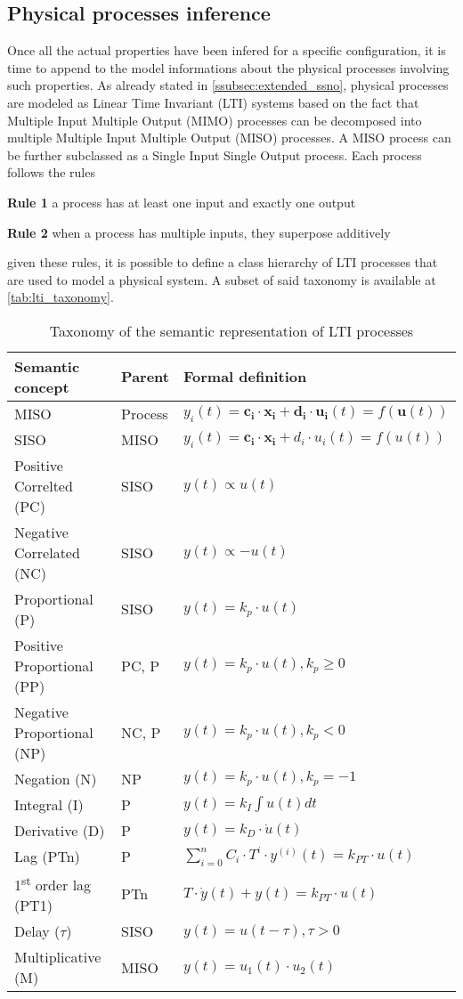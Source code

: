 \subsection{Physical processes inference}
Once all the actual properties have been infered for a specific configuration, it is time to append to the model informations about the physical processes involving such properties. As already stated in \autoref{ssubsec:extended_ssno}, physical processes are modeled as Linear Time Invariant (LTI) systems based on the fact that Multiple Input Multiple Output (MIMO) processes can be decomposed into multiple Multiple Input Multiple Output (MISO) processes. A MISO process can be further subclassed as a Single Input Single Output process. Each process follows the rules
\begin{description}[noitemsep]
  \item\textbf{Rule 1} a process has at least one input and exactly one output
  \item\textbf{Rule 2} when a process has multiple inputs, they superpose additively
\end{description}
given these rules, it is possible to define a class hierarchy of LTI processes that are used to model a physical system. A subset of said taxonomy is available at \autoref{tab:lti_taxonomy}.
\begin{table}
  \centering
  \caption{Taxonomy of the semantic representation of LTI processes}
  \label{tab:lti_taxonomy}

  \begin{tabular}{lll}\hline
    \textbf{Semantic concept} & \textbf{Parent} & \textbf{Formal definition} \\\hline
    MISO & Process & $y_i(t)=\mathbf{c_i}\cdot \mathbf{x_i}+\mathbf{d_i}\cdot \mathbf{u_i}(t)=f(\mathbf{u}(t))$ \\\hline
    SISO & MISO & $y_i(t)=\mathbf{c_i}\cdot \mathbf{x_i}+d_i\cdot u_i(t)=f(u(t))$ \\\hline
    Positive Correlted (PC) & SISO & $y(t)\propto u(t)$ \\
    Negative Correlated (NC) & SISO & $y(t)\propto -u(t)$ \\
    Proportional (P) & SISO & $y(t)=k_p\cdot u(t)$ \\
    Positive Proportional (PP) & PC, P & $y(t)=k_p\cdot u(t), k_p\geq 0$\\
    Negative Proportional (NP) & NC, P & $y(t)=k_p\cdot u(t), k_p<0$\\
    Negation (N) & NP & $y(t)=k_p\cdot u(t), k_p=-1$\\
    Integral (I) & P & $y(t)=k_I\int u(t)dt$\\
    Derivative (D) & P & $y(t)=k_D\cdot\dot u(t)$\\
    Lag (PTn) & P & $\sum_{i=0}^{n}C_i\cdot T^i \cdot y^{(i)}(t)=k_{PT}\cdot u(t) $\\
    1\textsuperscript{st} order lag (PT1) & PTn & $T\cdot\dot y(t)+y(t)=k_{PT}\cdot u(t)$\\
    Delay ($\tau$) & SISO & $y(t)=u(t-\tau), \tau>0$\\
    Multiplicative (M) & MISO & $y(t)=u_1(t)\cdot u_2(t)$
  \end{tabular}
\end{table}

